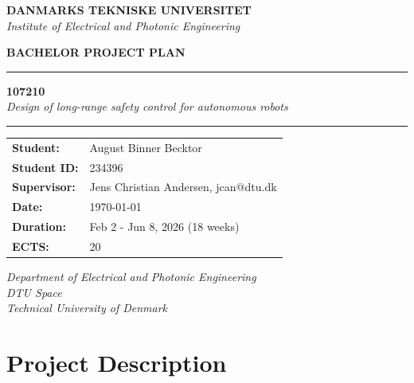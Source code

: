\documentclass[a4paper,12pt]{article}
\makeatletter
\newcommand{\projectID}{107210}
\newcommand{\studentName}{August Binner Becktor}
\newcommand{\studentID}{234396}
\newcommand{\supervisor}{Jens Christian Andersen, jcan@dtu.dk}
\newcommand{\projectDate}{\today}
\newcommand{\duration}{Feb 2 - Jun 8, 2026 (18 weeks)}
\newcommand{\ECTS}{20}
\makeatother
\begin{document}
\begin{titlepage}
    \centering
    \vspace*{2cm}
    
    \textbf{DANMARKS TEKNISKE UNIVERSITET} \\
    \textit{Institute of Electrical and Photonic Engineering} \\
    \vspace{2cm}
    
    \textbf{BACHELOR PROJECT PLAN} \\
    \vspace{1cm}
    
    \hrule
    \vspace{1cm}
    
    {\Large\textbf{\projectID}} \\
    \vspace{0.5cm}
    \textit{Design of long-range safety control for autonomous robots} \\
    \hrule
    
    \vspace{2cm}
    
    \begin{tabular}{ll}
        \textbf{Student:} & \studentName \\
        \textbf{Student ID:} & \studentID \\
        \textbf{Supervisor:} & \supervisor \\
        \textbf{Date:} & \projectDate \\
        \textbf{Duration:} & \duration \\
        \textbf{ECTS:} & \ECTS
    \end{tabular}
    
    \vspace{3cm}
    
    \textit{Department of Electrical and Photonic Engineering} \\
    \textit{DTU Space} \\
    \textit{Technical University of Denmark}
    
\end{titlepage}

\newpage
\tableofcontents
\newpage

\section{Project Description}

\end{document}

